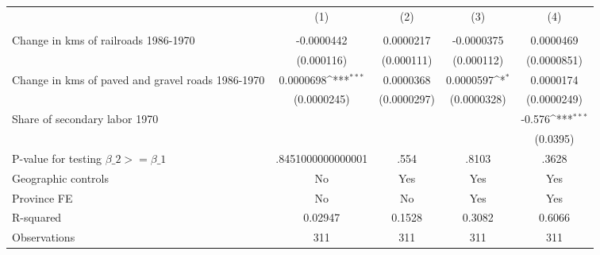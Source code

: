 {
\def\sym#1{\ifmmode^{#1}\else\(^{#1}\)\fi}
\begin{tabular}{l*{4}{c}}
\hline\hline
                &\multicolumn{1}{c}{(1)}&\multicolumn{1}{c}{(2)}&\multicolumn{1}{c}{(3)}&\multicolumn{1}{c}{(4)}\\
                &\multicolumn{1}{c}{}&\multicolumn{1}{c}{}&\multicolumn{1}{c}{}&\multicolumn{1}{c}{}\\
\hline
Change in kms of railroads 1986-1970&-0.0000442         &0.0000217         &-0.0000375         &0.0000469         \\
                &(0.000116)         &(0.000111)         &(0.000112)         &(0.0000851)         \\
[1em]
Change in kms of paved and gravel roads 1986-1970&0.0000698\sym{***}&0.0000368         &0.0000597\sym{*}  &0.0000174         \\
                &(0.0000245)         &(0.0000297)         &(0.0000328)         &(0.0000249)         \\
[1em]
Share of secondary labor 1970&                  &                  &                  &   -0.576\sym{***}\\
                &                  &                  &                  & (0.0395)         \\
\hline
P-value for testing $\beta\_{2} >= \beta\_{1}$&.8451000000000001         &     .554         &    .8103         &    .3628         \\
Geographic controls&       No         &      Yes         &      Yes         &      Yes         \\
Province FE     &       No         &       No         &      Yes         &      Yes         \\
R-squared       &  0.02947         &   0.1528         &   0.3082         &   0.6066         \\
Observations    &      311         &      311         &      311         &      311         \\
\hline\hline
\end{tabular}
}
